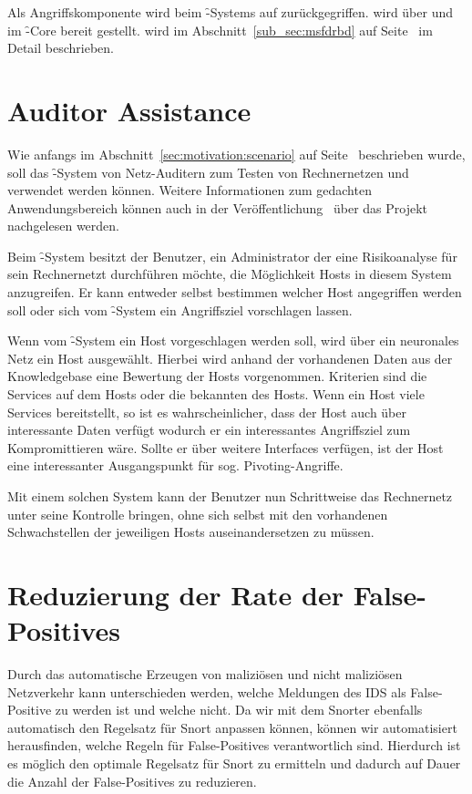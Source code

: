 Als Angriffskomponente wird beim \f-Systems auf  zurückgegriffen.
 wird über  und  im \f-Core bereit gestellt. 
 wird im Abschnitt~\ref{sub_sec:msfdrbd} auf 
Seite~\pageref{sub_sec:msfdrbd} im Detail beschrieben.  

\section{Auditor Assistance}

Wie anfangs im Abschnitt~\ref{sec:motivation:scenario} auf
Seite~\pageref{sec:motivation:scenario} beschrieben wurde, soll das \f-System
von Netz-Auditern zum Testen von Rechnernetzen und  verwendet werden
können. Weitere Informationen zum gedachten Anwendungsbereich können auch in
der Veröffentlichung~\cite{fidiuspaper} über das Projekt nachgelesen werden.

Beim \f-System besitzt der Benutzer, \zB ein Administrator der eine
Risikoanalyse für sein Rechnernetzt durchführen möchte, die Möglichkeit
Hosts in diesem System anzugreifen. Er kann entweder selbst bestimmen
welcher Host angegriffen werden soll oder sich vom \f-System ein
Angriffsziel vorschlagen lassen. 

Wenn vom \f-System ein Host vorgeschlagen werden soll, wird über ein
neuronales Netz ein Host ausgewählt. Hierbei wird anhand der vorhandenen
Daten aus der Knowledgebase eine Bewertung der Hosts vorgenommen. Kriterien
sind \zB die Services auf dem Hosts oder die bekannten 
des Hosts. Wenn ein Host viele Services bereitstellt, so ist es
wahrscheinlicher, dass der Host auch über interessante Daten verfügt wodurch
er ein interessantes Angriffsziel zum Kompromittieren wäre. Sollte er über
weitere Interfaces verfügen, ist der Host eine interessanter Ausgangspunkt
für sog. Pivoting-Angriffe.

Mit einem solchen System kann der Benutzer nun Schrittweise das Rechnernetz
unter seine Kontrolle bringen, ohne sich selbst mit den vorhandenen
Schwachstellen der jeweiligen Hosts auseinandersetzen zu müssen.

\section{Reduzierung der Rate der False-Positives}

Durch das automatische Erzeugen von maliziösen und nicht maliziösen
Netzverkehr kann unterschieden werden, welche Meldungen des IDS als
False-Positive zu werden ist und welche nicht. Da wir mit dem Snorter
ebenfalls automatisch den Regelsatz für Snort anpassen können, können
wir automatisiert herausfinden, welche Regeln für False-Positives
verantwortlich sind. Hierdurch ist es möglich den optimale Regelsatz
für Snort zu ermitteln und dadurch auf Dauer die Anzahl der
False-Positives zu reduzieren. 


